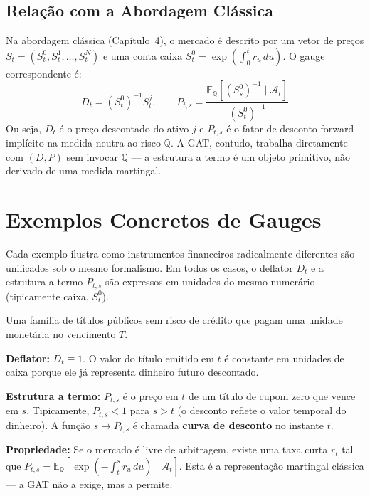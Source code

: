 \subsection{Rela\c{c}\~ao com a Abordagem Cl\'assica}

Na abordagem cl\'assica (Cap\'itulo~4), o mercado \'e descrito por um
vetor de pre\c{c}os $S_t = (S_t^0, S_t^1, \dots, S_t^N)$ e uma conta
caixa $S_t^0 = \exp(\int_0^t r_u\,du)$. O gauge correspondente \'e:
\[
D_t = (S_t^0)^{-1} S_t^j, \qquad
P_{t,s} = \frac{\mathbb{E}_{\mathbb{Q}}[(S_s^0)^{-1} \mid \mathcal{A}_t]}
 {(S_t^0)^{-1}}
\]
Ou seja, $D_t$ \'e o pre\c{c}o descontado do ativo $j$ e $P_{t,s}$
\'e o fator de desconto forward impl\'icito na medida neutra ao risco
$\mathbb{Q}$. A GAT, contudo, trabalha diretamente com $(D,P)$ sem
invocar $\mathbb{Q}$ --- a estrutura a termo \'e um objeto primitivo,
n\~ao derivado de uma medida martingal.

\section{Exemplos Concretos de Gauges}

Cada exemplo ilustra como instrumentos financeiros radicalmente
diferentes s\~ao unificados sob o mesmo formalismo. Em todos os casos,
o deflator $D_t$ e a estrutura a termo $P_{t,s}$ s\~ao expressos em
unidades do mesmo numer\'ario (tipicamente caixa, $S_t^0$).

\begin{ex}\label{ex:zero_bond}
Uma fam\'ilia de t\'itulos p\'ublicos sem risco de cr\'edito que pagam
uma unidade monet\'aria no vencimento $T$.

\noindent\textbf{Deflator:} $D_t \equiv 1$. O valor do t\'itulo
emitido em $t$ \'e constante em unidades de caixa porque ele j\'a
representa dinheiro futuro descontado.

\noindent\textbf{Estrutura a termo:} $P_{t,s}$ \'e o pre\c{c}o em $t$
de um t\'itulo de cupom zero que vence em $s$. Tipicamente,
$P_{t,s} < 1$ para $s > t$ (o desconto reflete o valor temporal do
dinheiro). A fun\c{c}\~ao $s \mapsto P_{t,s}$ \'e chamada
\textbf{curva de desconto} no instante $t$.

\noindent\textbf{Propriedade:} Se o mercado \'e livre de arbitragem,
existe uma taxa curta $r_t$ tal que $P_{t,s} = \mathbb{E}_{\mathbb{Q}}[\exp(-\int_t^s
r_u\,du) \mid \mathcal{A}_t]$. Esta \'e a representa\c{c}\~ao
martingal cl\'assica --- a GAT n\~ao a exige, mas a permite.
\end{ex}

